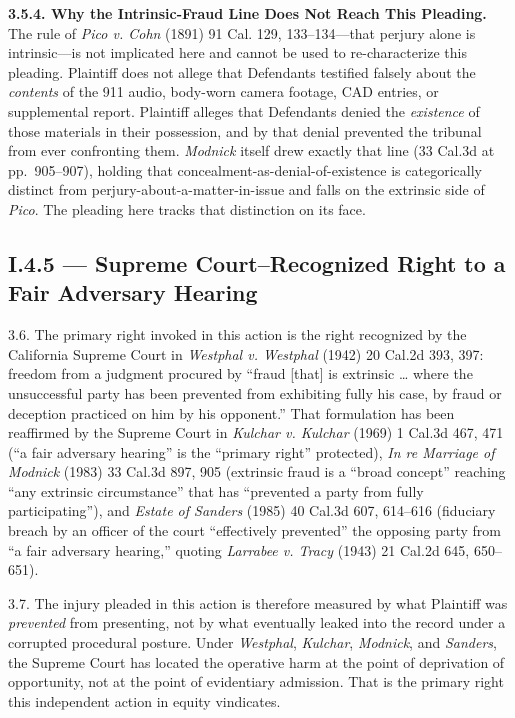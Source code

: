 \textbf{3.5.4. Why the Intrinsic-Fraud Line Does Not Reach This Pleading.} The rule of \emph{Pico v. Cohn} (1891) 91 Cal. 129, 133--134---that perjury alone is intrinsic---is not implicated here and cannot be used to re-characterize this pleading. Plaintiff does not allege that Defendants testified falsely about the \emph{contents} of the 911 audio, body-worn camera footage, CAD entries, or supplemental report. Plaintiff alleges that Defendants denied the \emph{existence} of those materials in their possession, and by that denial prevented the tribunal from ever confronting them. \emph{Modnick} itself drew exactly that line (33 Cal.3d at pp.~905--907), holding that concealment-as-denial-of-existence is categorically distinct from perjury-about-a-matter-in-issue and falls on the extrinsic side of \emph{Pico}. The pleading here tracks that distinction on its face.

\subsection{\textsection{}I.4.5 --- Supreme Court--Recognized Right to a Fair Adversary Hearing}\label{i.4.5-supreme-courtrecognized-right-to-a-fair-adversary-hearing}

3.6. The primary right invoked in this action is the right recognized by the California Supreme Court in \emph{Westphal v. Westphal} (1942) 20 Cal.2d 393, 397: freedom from a judgment procured by ``fraud {[}that{]} is extrinsic \ldots{} where the unsuccessful party has been prevented from exhibiting fully his case, by fraud or deception practiced on him by his opponent.'' That formulation has been reaffirmed by the Supreme Court in \emph{Kulchar v. Kulchar} (1969) 1 Cal.3d 467, 471 (``a fair adversary hearing'' is the ``primary right'' protected), \emph{In re Marriage of Modnick} (1983) 33 Cal.3d 897, 905 (extrinsic fraud is a ``broad concept'' reaching ``any extrinsic circumstance'' that has ``prevented a party from fully participating''), and \emph{Estate of Sanders} (1985) 40 Cal.3d 607, 614--616 (fiduciary breach by an officer of the court ``effectively prevented'' the opposing party from ``a fair adversary hearing,'' quoting \emph{Larrabee v. Tracy} (1943) 21 Cal.2d 645, 650--651).

3.7. The injury pleaded in this action is therefore measured by what Plaintiff was \emph{prevented} from presenting, not by what eventually leaked into the record under a corrupted procedural posture. Under \emph{Westphal}, \emph{Kulchar}, \emph{Modnick}, and \emph{Sanders}, the Supreme Court has located the operative harm at the point of deprivation of opportunity, not at the point of evidentiary admission. That is the primary right this independent action in equity vindicates.

